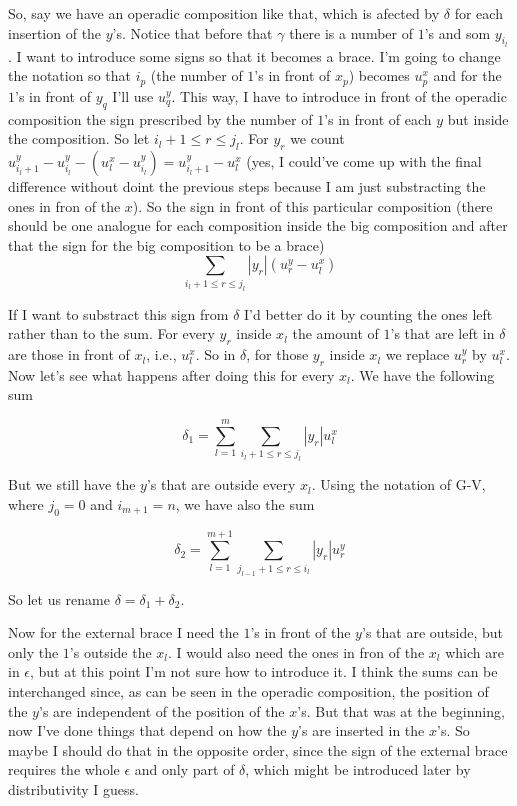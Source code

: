 \documentclass[twoside]{article}
\begin{document}
So, say we have an operadic composition like that, which is afected by $\delta$ for each insertion of the $y$'s. Notice that before that $\gamma$ there is a number of $1$'s and som $y_{i_l}$. I want to introduce some signs so that it becomes a brace. I'm going to change the notation so that $i_p$ (the number of $1$'s in front of $x_p$) becomes $u^x_p$ and for the $1$'s in front of $y_q$ I'll use $u^y_q$. This way, I have to introduce in front of the operadic composition the sign prescribed by the number of $1$'s in front of each $y$ but inside the composition. So let $i_l+1\leq r\leq j_l$. For $y_r$ we count $u^y_{i_l+1}-u^y_{i_l}-(u^x_l-u^y_{i_l})=u^y_{i_l+1}-u^x_l$ (yes, I could've come up with the final difference without doint the previous steps because I am just substracting the ones in fron of the $x$). So the sign in front of this particular composition (there should be one analogue for each composition inside the big composition and after that the sign for the big composition to be a brace)
$$\sum_{i_l+1\leq r\leq j_l}|y_r|(u^y_r-u^x_l)$$

If I want to substract this sign from $\delta$ I'd better do it by counting the ones left rather than to the sum. For every $y_r$ inside $x_l$ the amount of $1$'s that are left in $\delta$ are those in front of $x_l$, i.e., $u^x_l$. So in $\delta$, for those $y_r$ inside $x_l$ we replace $u^y_r$ by $u^x_l$. Now let's see what happens after doing this for every $x_l$. We have the following sum 

$$\delta_1=\sum_{l=1}^m\sum_{i_l+1\leq r\leq j_l}|y_r|u^x_l$$

But we still have the $y$'s that are outside every $x_l$. Using the notation of G-V, where $j_0=0$ and $i_{m+1}=n$, we have also the sum

$$\delta_2=\sum_{l=1}^{m+1}\sum_{j_{l-1}+1\leq r\leq i_l}|y_r|u^y_r$$

So let us rename $\delta=\delta_1+\delta_2$.

Now for the external brace I need the $1$'s in front of the $y$'s that are outside, but only the $1$'s outside the $x_l$. I would also need the ones in fron of the $x_l$ which are in $\epsilon$, but at this point I'm not sure how to introduce it. I think the sums can be interchanged since, as can be seen in the operadic composition, the position of the $y$'s are independent of the position of the $x$'s. But that was at the beginning, now I've done things that depend on how the $y$'s are inserted in the $x$'s. So maybe I should do that in the opposite order, since the sign of the external brace requires the whole $\epsilon$ and only part of $\delta$, which might be introduced later by distributivity I guess.
\end{document}
